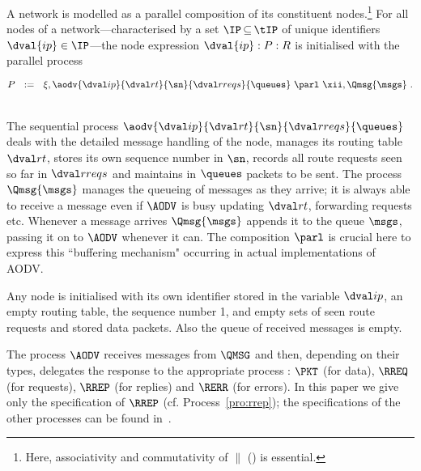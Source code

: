 \documentclass[envcountsame,envcountsect,orivec,runningheads]{llncs}
\begin{document}
A network is modelled as a parallel composition of its constituent nodes.\footnote{Here, associativity and commutativity of $\|$ () is essential.}
For all nodes of a network---characterised by a set $\IP\mathop{\subseteq}\tIP$ of
unique identifiers $\dval{ip}\in\IP$---the node expression
$\dval{ip}:P:R$ is initialised with the parallel process
\\[1.5mm]
\centerline{$
P\ \ :=\ \ \xi,\aodv{\ip}{\rt}{\sn}{\rreqs}{\queues}\ \parl\ \xii,\Qmsg{\msgs}\ .
$}\\[1.5mm]
The sequential process $\aodv{\ip}{\rt}{\sn}{\rreqs}{\queues}$ deals with
the detailed message handling of the node, manages its routing table
$\rt$, stores its own sequence number in $\sn$, records all route requests seen so far in $\rreqs$ and
maintains in $\queues$ packets to be sent. The process $\Qmsg{\msgs}$
manages the queueing of messages as they arrive; it is always able to
receive a message even if $\AODV$ is busy updating $\rt$, forwarding
requests etc. Whenever a message arrives $\Qmsg{\msgs}$ appends it to
the queue $\msgs$, passing it on to $\AODV$ whenever it can.  The
composition $\parl$ is crucial here to express this ``buffering
mechanism" occurring in actual implementations of AODV.

Any node is initialised with its own identifier stored in the variable $\ip$,
an empty routing table, the sequence number 1, and empty
sets of seen route requests and stored data packets. Also the
queue of received messages is empty.


The process $\AODV$ receives messages from $\QMSG$ and then, depending
on their types, delegates the response to the appropriate process :
$\PKT$ (for data), $\RREQ$ (for requests), $\RREP$ (for replies) and
$\RERR$ (for errors). 
In this paper we 
give only the specification of $\RREP$ (cf. Process~\ref{pro:rrep});
the specifications of the other processes can be found in~\cite[Sect. 6]{TR11}.
\end{document}
